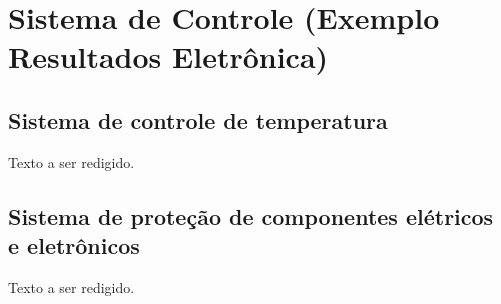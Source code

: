 \section{Sistema de Controle (Exemplo Resultados Eletrônica)}

\subsection{Sistema de controle de temperatura}

Texto a ser redigido.

\subsection{Sistema de proteção de componentes elétricos e eletrônicos}

Texto a ser redigido.

